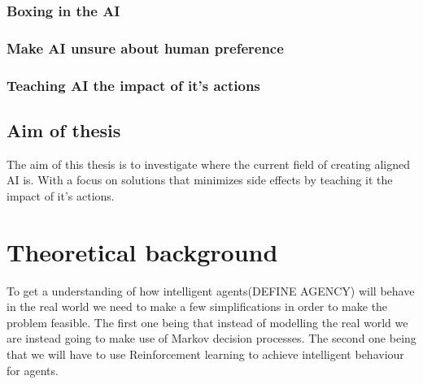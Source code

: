 \documentclass[12pt,A4]{report}
\theoremstyle{definition}
\begin{document}
\subsection{Boxing in the AI}

\subsection{Make AI unsure about human preference}

\subsection{Teaching AI the impact of it's actions}

\section{Aim of thesis}
The aim of this thesis is to investigate where the current field of creating aligned AI is. With a focus on solutions that minimizes side effects by teaching it the impact of it's actions.













\chapter{Theoretical background}
To get a understanding of how intelligent agents(DEFINE AGENCY) will behave in the real world we need to make a few simplifications in order to make the problem feasible. The first one being that instead of modelling the real world we are instead going to make use of Markov decision processes. The second one being that we will have to use Reinforcement learning to achieve intelligent behaviour for agents. 
\end{document}
